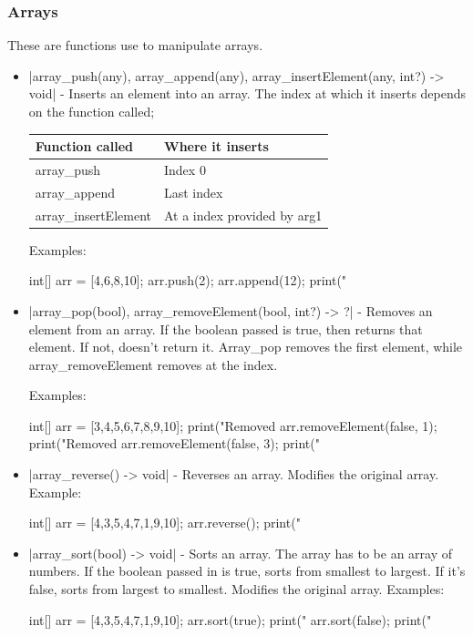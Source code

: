 \documentclass[12pt, letterpaper, oneside]{article}
\begin{document}
	\subsubsection{Arrays}
	These are functions use to manipulate arrays.
	\begin{itemize}
		\item[--] \spverb|array_push(any), array_append(any), array_insertElement(any, int?) -> void| - Inserts an element into an array. The index at which it inserts depends on the function called;
		
		
		\begin{tabular}{|p{4cm}|p{5cm}|}
			\hline
			Function called&Where it inserts\\
			\hline
			array\_push&Index 0\\
			\hline
			array\_append&Last index\\
			\hline 
			array\_insertElement&At a index provided by arg1\\
			\hline 
		\end{tabular}
		
		Examples:
		\begin{spverbatim}
			int[] arr = [4,6,8,10];
			arr.push(2);
			arr.append(12);
			print("%
		\end{spverbatim}
		\item[--] \spverb|array_pop(bool), array_removeElement(bool, int?) -> ?| - \newline Removes an element from an array. If the boolean passed is true, then returns that element. If not, doesn't return it. Array\_pop removes the first element, while array\_removeElement removes at the index.
		
		
		Examples:
		\begin{spverbatim}
			int[] arr = [3,4,5,6,7,8,9,10];
			print("Removed %
			arr.removeElement(false, 1);
			print("Removed %
			arr.removeElement(false, 3);
			print("%
		\end{spverbatim}
		\item[--] \spverb|array_reverse() -> void| - Reverses an array. Modifies the original array. Example:
		
		
		\begin{spverbatim}
			int[] arr = [4,3,5,4,7,1,9,10];
			arr.reverse();
			print("\n%
		\end{spverbatim}
		\newpage 
		\item[--] \spverb|array_sort(bool) -> void| - Sorts an array. The array has to be an array of numbers. If the boolean passed in is true, sorts from smallest to largest. If it's false, sorts from largest to smallest. Modifies the original array. Examples:
		
		
		\begin{spverbatim}
			int[] arr = [4,3,5,4,7,1,9,10];
			arr.sort(true);
			print("\n%
			arr.sort(false);
			print("%
		\end{spverbatim}
	\end{itemize}
\end{document}
